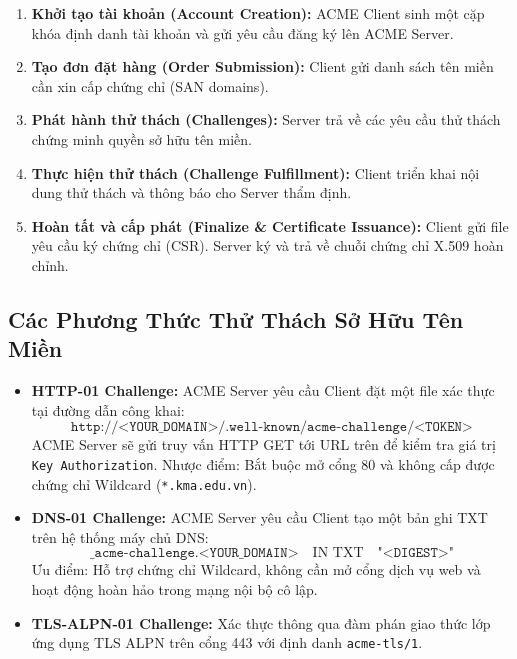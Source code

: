 \begin{enumerate}
  \item \textbf{Khởi tạo tài khoản (Account Creation):} ACME Client sinh một cặp khóa định danh tài khoản và gửi yêu cầu đăng ký lên ACME Server.
  \item \textbf{Tạo đơn đặt hàng (Order Submission):} Client gửi danh sách tên miền cần xin cấp chứng chỉ (SAN domains).
  \item \textbf{Phát hành thử thách (Challenges):} Server trả về các yêu cầu thử thách chứng minh quyền sở hữu tên miền.
  \item \textbf{Thực hiện thử thách (Challenge Fulfillment):} Client triển khai nội dung thử thách và thông báo cho Server thẩm định.
  \item \textbf{Hoàn tất và cấp phát (Finalize \& Certificate Issuance):} Client gửi file yêu cầu ký chứng chỉ (CSR). Server ký và trả về chuỗi chứng chỉ X.509 hoàn chỉnh.
\end{enumerate}

\subsection{Các Phương Thức Thử Thách Sở Hữu Tên Miền}

\begin{itemize}
  \item \textbf{HTTP-01 Challenge:} ACME Server yêu cầu Client đặt một file xác thực tại đường dẫn công khai:
  \begin{equation}
  \texttt{http://<YOUR\_DOMAIN>/.well-known/acme-challenge/<TOKEN>}
  \end{equation}
  ACME Server sẽ gửi truy vấn HTTP GET tới URL trên để kiểm tra giá trị \texttt{Key Authorization}. Nhược điểm: Bắt buộc mở cổng 80 và không cấp được chứng chỉ Wildcard (\texttt{*.kma.edu.vn}).
  \item \textbf{DNS-01 Challenge:} ACME Server yêu cầu Client tạo một bản ghi TXT trên hệ thống máy chủ DNS:
  \begin{equation}
  \texttt{\_acme-challenge.<YOUR\_DOMAIN>} \quad \text{IN TXT} \quad \texttt{"<DIGEST>"}
  \end{equation}
  Ưu điểm: Hỗ trợ chứng chỉ Wildcard, không cần mở cổng dịch vụ web và hoạt động hoàn hảo trong mạng nội bộ cô lập.
  \item \textbf{TLS-ALPN-01 Challenge:} Xác thực thông qua đàm phán giao thức lớp ứng dụng TLS ALPN trên cổng 443 với định danh \texttt{acme-tls/1}.
\end{itemize}

